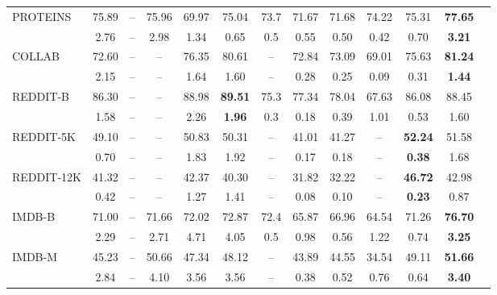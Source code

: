 \documentclass[letterpaper]{article} \usepackage{aaai19}  \usepackage{times}  \usepackage{helvet}  \usepackage{courier}  \usepackage{url}  \usepackage{graphicx}  \frenchspacing  \setlength{\pdfpagewidth}{8.5in}  \setlength{\pdfpageheight}{11in}
\begin{document}
\begin{table*}[!t]
\begin{sc}
{\begin{tabular}{|l| c c c| c c | c c c |c |c |c |c|}
			\midrule
			\multirow{2}{*}{PROTEINS}
			& 75.89  &--   &75.96  &69.97 & 75.04   & 73.7  & 71.67   & 71.68  & 74.22    & 75.31  & \textbf{77.65}     \\			
			&  2.76  &--   &2.98  &1.34  &  0.65  &   0.5  &  0.55  &   0.50  &  0.42	&   0.70 & \textbf{ 3.21}      \\
			
			\midrule
			\multirow{2}{*}{COLLAB}
			& 72.60  &--    &--  &76.35 & 80.61 & -- & 72.84 & 73.09 & 69.01 & 75.63 & \textbf{81.24}     \\			
			&  2.15  &--   &--  &1.64  &  1.60  & --  &  0.28  &  0.25  &  0.09
			&  0.31  & \textbf{ 1.44}      \\
			
			\midrule
			\multirow{2}{*}{REDDIT-B}
			& 86.30  &--     &--  &88.98 &\textbf{89.51}  &75.3 & 77.34 & 78.04 & 67.63  & 86.08 & 88.45   \\			
			&  1.58  &--   &--  &2.26  & \textbf{ 1.96}  &  0.3  &  0.18  &  0.39  &  1.01
			&  0.53  &  1.60     \\
			
			\midrule
			\multirow{2}{*}{REDDIT-5K}
			& 49.10  &--      &--  &50.83   & 50.31 & --  & 41.01 & 41.27 & --  &\textbf{52.24} &51.58 \\		
			&  0.70  &--    &--  &1.83  & 1.92  & --  &  0.17  &  0.18  & --
			& \textbf{ 0.38}  &  1.68   \\
			
			\midrule
			\multirow{2}{*}{REDDIT-12K}
			& 41.32  &--      &--  &42.37  & 40.30 & --  & 31.82 & 32.22 & --  & \textbf{46.72} & 42.98 \\			
			&  0.42  &--    &--  &1.27   &  1.41  & -- &  0.08  &  0.10  & --
			& \textbf{ 0.23} &  0.87     \\
			
			\midrule
			\multirow{2}{*}{IMDB-B}
			& 71.00   &--    &71.66  &72.02 & 72.87 & 72.4 & 65.87 & 66.96 & 64.54 	& 71.26 & \textbf{76.70}     \\			
			&  2.29  &--    &2.71  &4.71  &  4.05  &  0.5  &  0.98  &  0.56  &  1.22
			&  0.74  & \textbf{ 3.25}      \\
			
			\midrule
			\multirow{2}{*}{IMDB-M}
			& 45.23 &--     &50.66  &47.34  & 48.12 & -- & 43.89 & 44.55 & 34.54 & 49.11 & \textbf{51.66}      \\			
			&  2.84  &--  &4.10  &3.56  &  3.56  & -- &  0.38  &  0.52  &  0.76
			&  0.64  & \textbf{ 3.40}      \\
			\bottomrule
		\end{tabular}
	}
	\end{sc}
	\label{table:state-of-the-art}
\end{table*}
\end{document}
